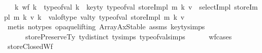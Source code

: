 \begin{isabellebody}
\ \ \ {\isachardoublequoteopen}{\isacharparenleft}{\kern0pt}{\isasymforall}k{\isachardot}{\kern0pt}\ {\isacharparenleft}{\kern0pt}{\isasymnot}wf\ k\ {\isasymor}\ type{\isacharunderscore}{\kern0pt}of{\isacharunderscore}{\kern0pt}val\ k\ {\isasymnoteq}\ key{\isacharunderscore}{\kern0pt}ty\ {\isacharparenleft}{\kern0pt}type{\isacharunderscore}{\kern0pt}of{\isacharunderscore}{\kern0pt}val\ {\isacharparenleft}{\kern0pt}storeImpl\ m\ k{\isacharprime}{\kern0pt}\ v{\isacharparenright}{\kern0pt}{\isacharparenright}{\kern0pt}{\isacharparenright}{\kern0pt}\ {\isasymlongrightarrow}\ {\isacharparenleft}{\kern0pt}selectImpl\ {\isacharparenleft}{\kern0pt}storeImpl\ m\ k{\isacharprime}{\kern0pt}\ v{\isacharparenright}{\kern0pt}\ k{\isacharparenright}{\kern0pt}\ {\isacharequal}{\kern0pt}\ val{\isacharunderscore}{\kern0pt}of{\isacharunderscore}{\kern0pt}type\ {\isacharparenleft}{\kern0pt}val{\isacharunderscore}{\kern0pt}ty\ {\isacharparenleft}{\kern0pt}type{\isacharunderscore}{\kern0pt}of{\isacharunderscore}{\kern0pt}val\ {\isacharparenleft}{\kern0pt}storeImpl\ m\ k{\isacharprime}{\kern0pt}\ v{\isacharparenright}{\kern0pt}{\isacharparenright}{\kern0pt}{\isacharparenright}{\kern0pt}{\isacharparenright}{\kern0pt}{\isachardoublequoteclose}\isanewline
%
\isadelimproof
\ \ %
\endisadelimproof
%
\isatagproof
{}\isamarkupfalse%
\ {\isacharparenleft}{\kern0pt}metis\ {\isacharparenleft}{\kern0pt}no{\isacharunderscore}{\kern0pt}types{\isacharcomma}{\kern0pt}\ opaque{\isacharunderscore}{\kern0pt}lifting{\isacharparenright}{\kern0pt}\ ArrayAxStable\ assms{\isacharparenleft}{\kern0pt}{}{\isacharcomma}{\kern0pt}{}{\isacharcomma}{\kern0pt}{}{\isacharparenright}{\kern0pt}\ key{\isacharunderscore}{\kern0pt}ty{\isachardot}{\kern0pt}simps{\isacharparenleft}{\kern0pt}{}{\isacharparenright}{\kern0pt}\isanewline
\ \ \ \ \ \ storePreserveTy\ ty{\isachardot}{\kern0pt}distinct{\isacharparenleft}{\kern0pt}{}{\isacharparenright}{\kern0pt}\ ty{\isachardot}{\kern0pt}simps{\isacharparenleft}{\kern0pt}{}{}{\isacharparenright}{\kern0pt}\ type{\isacharunderscore}{\kern0pt}of{\isacharunderscore}{\kern0pt}val{\isachardot}{\kern0pt}simps{\isacharparenleft}{\kern0pt}{}{\isacharcomma}{\kern0pt}{}{\isacharparenright}{\kern0pt}\isanewline
\ \ \ \ \ \ wf{\isachardot}{\kern0pt}cases{\isacharparenright}{\kern0pt}%
\endisatagproof
{\isafoldproof}%
%
\isadelimproof
\isanewline
%
\endisadelimproof
\isanewline
\isanewline
{}\isamarkupfalse%
\ storeClosedWf{\isacharcolon}{\kern0pt}\isanewline

\end{isabellebody}
